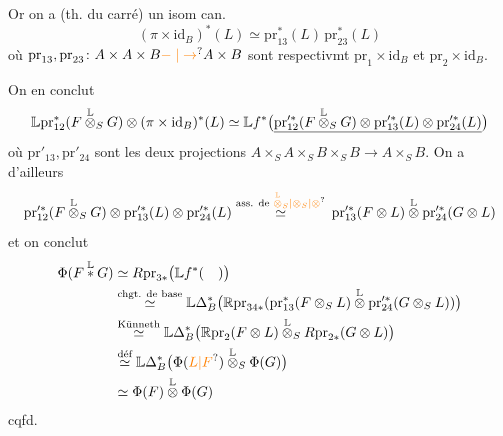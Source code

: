 Or on a (th. du carré) un isom can.
\[
(\pi\times \mathrm{id}_B)^*(L)\simeq \mathrm{pr}_{13}^*(L)\,\mathrm{pr}_{23}^*(L)
\]
où $\mathrm{pr}_{13},\mathrm{pr}_{23}\colon A\times A\times B\unsure{\mathrel{-}|\to} A\times B$ sont respectivmt $\mathrm{pr}_1\times \mathrm{id}_B$ et $\mathrm{pr}_2\times \mathrm{id}_B$.

On en conclut
\[
\mathbb{L} \mathrm{pr}_{12}^*(F\overset{\mathbb L}{\otimes}_S G)\otimes(\pi\times \mathrm{id}_B)^*(L)\simeq \mathbb{L} f^*\bigl(\underline{\tikz[remember picture,baseline]{\coordinate (quatretermes) at (0,0);}\mathrm{pr}_{12}^{\prime *}(F\overset{\mathbb L}{\otimes}_S G)\otimes \mathrm{pr}_{13}^{\prime *}(L)\otimes \mathrm{pr}_{24}^{\prime *}(L)}\bigr)
\]
où $\mathrm{pr}'_{13},\mathrm{pr}'_{24}$ sont les deux projections $A\times_S A\times_S B\times_S B\longrightarrow A\times_S B$. On a d'ailleurs
\[
\mathrm{pr}_{12}^{\prime *}(F\overset{\mathbb L}{\otimes}_S G)\otimes \mathrm{pr}_{13}^{\prime *}(L)\otimes \mathrm{pr}_{24}^{\prime *}(L)
\overset{\text{ass. de }\unsure{\overset{\mathbb L}{\otimes}_S|\otimes_S|\otimes}}{\simeq}
\tikz[remember picture,baseline]{\coordinate (quatrehaut) at (0,0);}\,\mathrm{pr}_{13}^{\prime *}(F\otimes L)\overset{\mathbb L}{\otimes} \mathrm{pr}_{24}^{\prime *}(G\otimes L)
\]
 et on conclut
\[
\begin{aligned}
\Phi(F\overset{\mathbb L}{*} G)&\simeq R \mathrm{pr}_{3*}\bigl(\mathbb{L} f^*(\tikz[remember picture,baseline]{\coordinate (quatrebas) at (0,0);}\hspace{1em})\bigr)\\
&\overset{\text{chgt. de base}}{\simeq}\mathbb{L}\Delta_B^*\bigl(\mathbb{R} \mathrm{pr}_{34*}(\mathrm{pr}_{13}^*(F\otimes_S L)\overset{\mathbb L}{\otimes} \mathrm{pr}_{24}^{\prime *}(G\otimes_S L))\bigr)\\
&\overset{\text{Künneth}}{\simeq}\mathbb{L}\Delta_B^*\bigl(\mathbb{R} \mathrm{pr}_2(F\otimes L)\overset{\mathbb L}{\otimes}_S R \mathrm{pr}_{2*}(G\otimes L)\bigr)\\
&\overset{\text{déf}}{\simeq}\mathbb{L}\Delta_B^*\bigl(\Phi(\unsure{L|F})\overset{\mathbb L}{\otimes}_S\Phi(G)\bigr)\\
&\simeq\Phi(F)\overset{\mathbb L}{\otimes}\Phi(G)
\end{aligned}
\]
cqfd.

